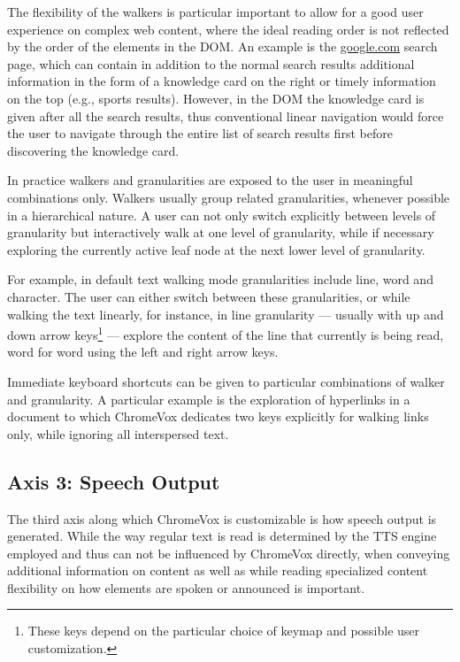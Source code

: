\documentclass{sig-alternate}
\begin{document}
The flexibility of the walkers is particular important to allow for a good user
experience on complex web content, where the ideal reading order is not
reflected by the order of the elements in the DOM. An example is the
\url{google.com} search page, which can contain in addition to the normal search
results additional information in the form of a knowledge card on the right or
timely information on the top (e.g., sports results). However, in the DOM the
knowledge card is given after all the search results, thus conventional linear
navigation would force the user to navigate through the entire list of search
results first before discovering the knowledge card.

In practice walkers and granularities are exposed to the user in meaningful
combinations only. Walkers usually group related granularities, whenever
possible in a hierarchical nature.  A user can not only switch explicitly
between levels of granularity but interactively walk at one level of
granularity, while if necessary exploring the currently active leaf node at the
next lower level of granularity.

For example, in default text walking mode granularities include line, word and
character. The user can either switch between these granularities, or while
walking the text linearly, for instance, in line granularity --- usually with up
and down arrow keys\footnote{These keys depend on the particular choice of
  keymap and possible user customization.}  --- explore the content of the line
that currently is being read, word for word using the left and right arrow keys.

Immediate keyboard shortcuts can be given to particular combinations of walker
and granularity. A particular example is the exploration of hyperlinks in a
document to which ChromeVox dedicates two keys explicitly for walking links
only, while ignoring all interspersed text.

\subsection{Axis 3: Speech Output}
\label{sec:ax3}

The third axis along which ChromeVox is customizable is how speech output is
generated. While the way regular text is read is determined by the TTS engine
employed and thus can not be influenced by ChromeVox directly, when conveying
additional information on content as well as while reading specialized content
flexibility on how elements are spoken or announced is important.
\end{document}
